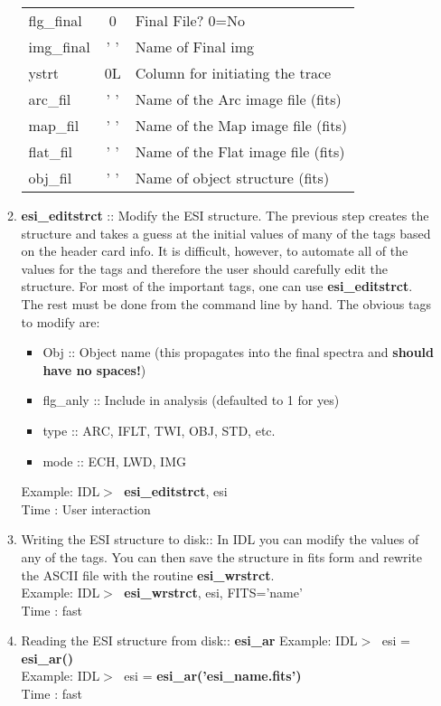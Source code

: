 \documentclass[11pt,letterpaper,dvips]{article}
\begin{document}
\begin{enumerate}
\begin{enumerate}
{\begin{tabular}{lcl}
         flg\_final & 0   & Final File? 0=No \\
         img\_final & ' '  & Name of Final img \\
         ystrt & 0L      & Column for initiating the trace \\
         arc\_fil & ' '   & Name of the Arc image file (fits) \\
         map\_fil & ' '   & Name of the Map image file (fits) \\
         flat\_fil & ' '   & Name of the Flat image file (fits) \\
         obj\_fil & ' '  &  Name of object structure (fits) \\
	  \hline
	\end{tabular}
	}
	

    \item {\bf esi\_editstrct} :: Modify the ESI structure.
	The previous step creates the structure and takes a guess at the 
	initial values of many of the tags based on the header card info.  It
	is difficult, however, to automate all of the values for the tags and
	therefore the user should carefully edit the structure.  For most of
	the important tags, one can use {\bf esi\_editstrct}.  The rest must
	be done from the command line by hand.
	The obvious tags to modify are: 
	 \begin{itemize}
	  \item Obj :: Object name (this propagates into the final spectra 
		and {\bf should have no spaces!})
	  \item flg\_anly :: Include in analysis (defaulted to 1 for yes)
	  \item type :: ARC, IFLT, TWI, OBJ, STD, etc.  
	  \item mode :: ECH, LWD, IMG 
	 \end{itemize}

         \quad Example: IDL$> \;$ {\bf esi\_editstrct}, esi \\  
         \quad Time   : User interaction

    \item Writing the ESI structure to disk:: In IDL you can modify the values
	of any of the tags.  You can then save the structure in fits form and 
	rewrite the ASCII file  with the routine {\bf esi\_wrstrct}. \\
         \quad Example: IDL$> \;$ {\bf esi\_wrstrct}, esi, FITS='name' \\
         \quad Time   : fast

    \item Reading the ESI structure from disk:: {\bf esi\_ar}
         \quad Example: IDL$> \;$ esi = {\bf esi\_ar()} \\
         \quad Example: IDL$> \;$ esi = {\bf esi\_ar('esi\_name.fits')} \\
         \quad Time   : fast


\end{enumerate}
\end{enumerate}
\end{document}
